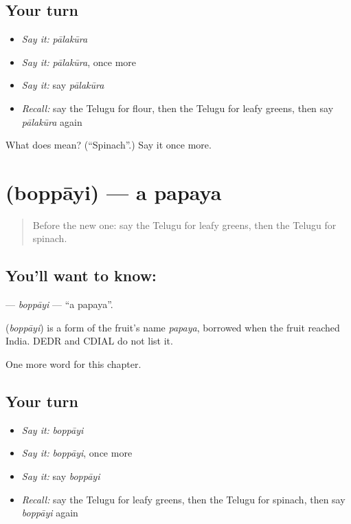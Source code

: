 \subsection*{Your turn}
\begin{itemize}
\raggedright
  \item \emph{Say it:} \emph{pālakūra}
  \item \emph{Say it:} \emph{pālakūra}, once more
  \item \emph{Say it:} say \emph{pālakūra}
  \item \emph{Recall:} say the Telugu for flour, then the Telugu for leafy greens, then say \emph{pālakūra} again
\end{itemize}

\begin{tcolorbox}[breakable,colback=teal!4,colframe=teal!35!black,title={Before you move on}]
What does  mean? (\textquotedblleft{}Spinach\textquotedblright{}.) Say it once more.
\end{tcolorbox}
\section[\texorpdfstring{\te{బొప్పాయి} (boppāyi)}{బొప్పాయి (boppāyi)}]{ (boppāyi) — a papaya}

\label{lesson:TE-C225-boppayi}



\begin{quote}
Before the new one: say the Telugu for leafy greens, then the Telugu for spinach.
\end{quote}

\subsection*{You'll want to know: }
\textbf{} — \emph{boppāyi} — \textquotedblleft{}a papaya\textquotedblright{}.

\begin{cousinweb}
\textbf{} (\emph{boppāyi}) is a form of the fruit's name \emph{papaya}, borrowed when the fruit reached India. DEDR and CDIAL do not list it.
\end{cousinweb}

\begin{grammarlens}[title={What you've built}]
One more word for this chapter.
\end{grammarlens}

\subsection*{Your turn}
\begin{itemize}
\raggedright
  \item \emph{Say it:} \emph{boppāyi}
  \item \emph{Say it:} \emph{boppāyi}, once more
  \item \emph{Say it:} say \emph{boppāyi}
  \item \emph{Recall:} say the Telugu for leafy greens, then the Telugu for spinach, then say \emph{boppāyi} again
\end{itemize}

